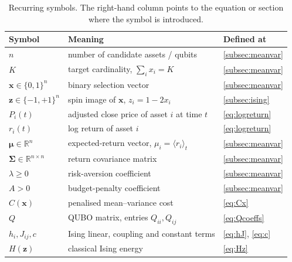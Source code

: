 \begin{table}[H]
    \centering
    \small
    \caption{Recurring symbols. The right-hand column points to the equation or section where the symbol is introduced.}
    \label{tab:notation}
    \begin{tabular}{@{}lll@{}}
        \toprule
        Symbol & Meaning & Defined at \\
        \midrule
        $n$                       & number of candidate assets / qubits                         & \cref{subsec:meanvar} \\
        $K$                       & target cardinality, $\sum_i x_i = K$                        & \cref{subsec:meanvar} \\
        $\boldsymbol{x} \in \{0,1\}^n$ & binary selection vector                                & \cref{subsec:meanvar} \\
        $\boldsymbol{z} \in \{-1,+1\}^n$ & spin image of $\boldsymbol{x}$, $z_i = 1-2x_i$       & \cref{subsec:ising} \\
        $P_i(t)$                  & adjusted close price of asset $i$ at time $t$               & \eqref{eq:logreturn} \\
        $r_i(t)$                  & log return of asset $i$                                     & \eqref{eq:logreturn} \\
        $\boldsymbol\mu \in \mathbb{R}^n$ & expected-return vector, $\mu_i = \langle r_i\rangle_t$ & \cref{subsec:meanvar} \\
        $\boldsymbol\Sigma \in \mathbb{R}^{n\times n}$ & return covariance matrix                  & \cref{subsec:meanvar} \\
        $\lambda \geq 0$          & risk-aversion coefficient                                   & \cref{subsec:meanvar} \\
        $A > 0$                   & budget-penalty coefficient                                  & \cref{subsec:meanvar} \\
        $C(\boldsymbol{x})$       & penalised mean--variance cost                               & \eqref{eq:Cx} \\
        $Q$                       & QUBO matrix, entries $Q_{ii}, Q_{ij}$                       & \eqref{eq:Qcoeffs} \\
        $h_i, J_{ij}, c$          & Ising linear, coupling and constant terms                   & \eqref{eq:hJ}, \eqref{eq:c} \\
        $H(\boldsymbol{z})$       & classical Ising energy                                      & \eqref{eq:Hz} \\

\end{tabular}
\end{table}
